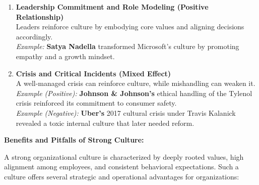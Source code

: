 \documentclass[10pt,a4paper]{book}
\begin{document}
\begin{enumerate}
    \item \textbf{Leadership Commitment and Role Modeling (Positive Relationship)} \\
    Leaders reinforce culture by embodying core values and aligning decisions accordingly.\\
    \textit{Example:} \textbf{Satya Nadella} transformed Microsoft’s culture by promoting empathy and a growth mindset.

    \item \textbf{Crisis and Critical Incidents (Mixed Effect)} \\
    A well-managed crisis can reinforce culture, while mishandling can weaken it.\\
    \textit{Example (Positive):} \textbf{Johnson \& Johnson’s} ethical handling of the Tylenol crisis reinforced its commitment to consumer safety.\\
    \textit{Example (Negative):} \textbf{Uber’s} 2017 cultural crisis under Travis Kalanick revealed a toxic internal culture that later needed reform.
\end{enumerate}

\vspace{0.5cm}

\textbf{Benefits and Pitfalls of Strong Culture:}

A strong organizational culture is characterized by deeply rooted values, high alignment among employees, and consistent behavioral expectations. Such a culture offers several strategic and operational advantages for organizations:
\end{document}
